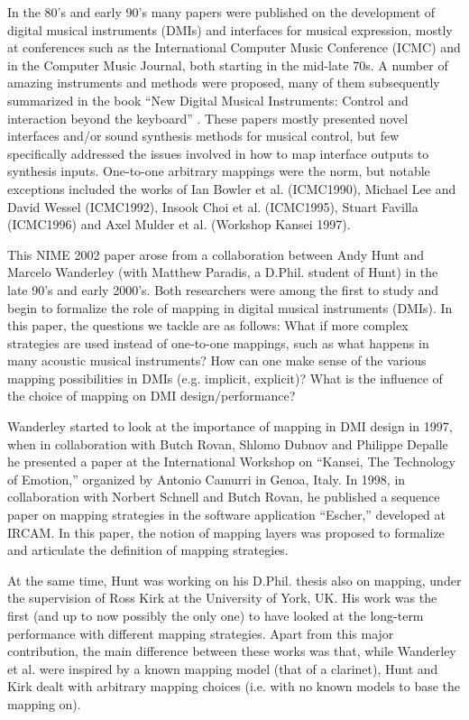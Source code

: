 In the 80's and early 90's many papers were published on the development of digital musical instruments (DMIs) and interfaces for musical expression, mostly at conferences such as the International Computer Music Conference (ICMC) and in the Computer Music Journal, both starting in the mid-late 70s. A number of amazing instruments and methods were proposed, many of them subsequently summarized in the book ``New Digital Musical Instruments: Control and interaction beyond the keyboard'' \cite{Miranda:2006}. These papers mostly presented novel interfaces and/or sound synthesis methods for musical control, but few specifically
addressed the issues involved in how to map interface outputs to synthesis inputs. One-to-one arbitrary mappings were the norm, but notable exceptions included the works of Ian Bowler et al. (ICMC1990), Michael Lee and David Wessel (ICMC1992), Insook Choi et al. (ICMC1995), Stuart Favilla (ICMC1996) and Axel Mulder et al. (Workshop Kansei 1997).

This NIME 2002 paper arose from a collaboration between Andy Hunt and Marcelo Wanderley (with Matthew Paradis, a D.Phil. student of Hunt) in the late 90's and early 2000's. Both researchers were among the first to study and begin to formalize the role of mapping in digital musical instruments (DMIs). In this paper, the questions we tackle are as follows: What if more complex strategies are used instead of one-to-one mappings, such as what happens in many acoustic musical instruments? How can one make sense of the various mapping possibilities in DMIs (e.g. implicit, explicit)? What is the influence of the choice of mapping on DMI design/performance?


Wanderley started to look at the importance of mapping in DMI design in 1997, when in collaboration with Butch Rovan, Shlomo Dubnov and Philippe Depalle he presented a paper at the International Workshop on ``Kansei, The Technology of Emotion,'' organized by Antonio Camurri in Genoa, Italy. In 1998, in collaboration with Norbert Schnell and Butch Rovan, he published a sequence paper on mapping strategies in the software application ``Escher,'' developed at IRCAM. In this paper, the notion of mapping layers was proposed to formalize and articulate the definition of mapping strategies.


At the same time, Hunt was working on his D.Phil. thesis also on mapping, under the supervision of Ross Kirk at the University of York, UK. His work was the first (and up to now possibly the only one) to have looked at the long-term performance with different mapping strategies. Apart from this major contribution, the main difference between these works was that, while Wanderley et al. were inspired by a known mapping model (that of a clarinet), Hunt and Kirk dealt with arbitrary mapping choices (i.e. with no known models to base the mapping on).


